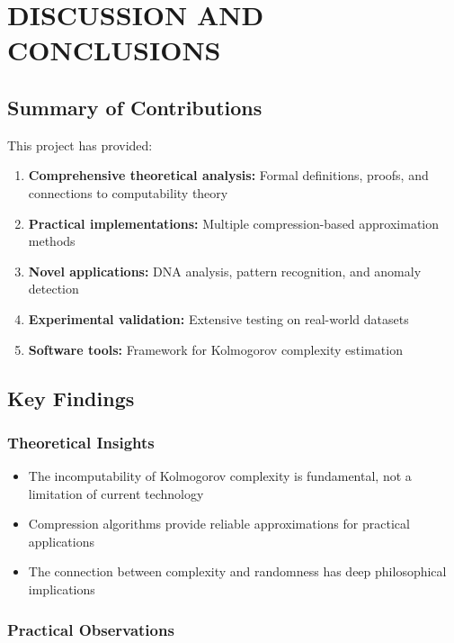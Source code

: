 \documentclass[12pt,a4paper]{report}
\begin{document}
\chapter{DISCUSSION AND CONCLUSIONS}

\section{Summary of Contributions}

This project has provided:

\begin{enumerate}
    \item \textbf{Comprehensive theoretical analysis:} Formal definitions, proofs, and connections to computability theory
    \item \textbf{Practical implementations:} Multiple compression-based approximation methods
    \item \textbf{Novel applications:} DNA analysis, pattern recognition, and anomaly detection
    \item \textbf{Experimental validation:} Extensive testing on real-world datasets
    \item \textbf{Software tools:} Framework for Kolmogorov complexity estimation
\end{enumerate}

\section{Key Findings}

\subsection{Theoretical Insights}

\begin{itemize}
    \item The incomputability of Kolmogorov complexity is fundamental, not a limitation of current technology
    \item Compression algorithms provide reliable approximations for practical applications
    \item The connection between complexity and randomness has deep philosophical implications
\end{itemize}

\subsection{Practical Observations}
\end{document}
